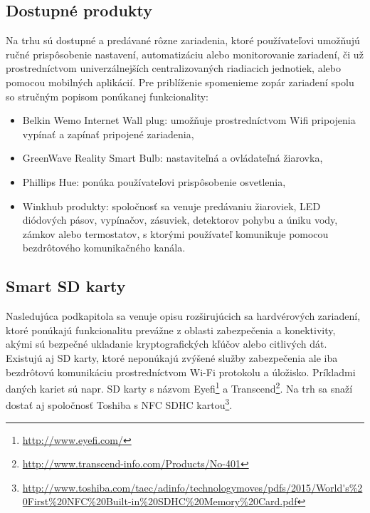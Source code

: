 \documentclass[12pt,a4paper,oneside,openright]{report}
\begin{document}
\subsection{Dostupné produkty} \label{s_devices}
Na trhu sú dostupné a predávané rôzne zariadenia, ktoré používateľovi umožňujú ručné prispôsobenie nastavení, automatizáciu alebo monitorovanie zariadení, či už prostredníctvom univerzálnejších centralizovaných riadiacich jednotiek, alebo pomocou mobilných aplikácií.
Pre priblíženie spomenieme zopár zariadení spolu so stručným popisom ponúkanej funkcionality:
\begin{itemize}
	\item Belkin Wemo Internet Wall plug: umožňuje prostredníctvom Wifi pripojenia vypínať a zapínať pripojené zariadenia,
	\item GreenWave Reality Smart Bulb: nastaviteľná a ovládateľná žiarovka,
	\item Phillips Hue: ponúka používateľovi prispôsobenie osvetlenia,
	\item Winkhub produkty: spoločnosť sa venuje predávaniu žiaroviek, LED diódových pásov, vypínačov, zásuviek, detektorov pohybu a úniku vody, zámkov alebo termostatov, s ktorými používateľ komunikuje pomocou bezdrôtového komunikačného kanála.
\end{itemize}
\onehalfspacing


\subsection{Smart SD karty}
Nasledujúca podkapitola sa venuje opisu rozširujúcich sa hardvérových zariadení, ktoré ponúkajú funkcionalitu prevážne z oblasti zabezpečenia a konektivity, akými sú bezpečné ukladanie kryptografických kľúčov alebo citlivých dát.
Existujú aj SD karty, ktoré neponúkajú zvýšené služby zabezpečenia ale iba bezdrôtovú komunikáciu prostredníctvom Wi-Fi protokolu a úložisko. Príkladmi daných kariet sú napr. SD karty s názvom Eyefi\footnote{\url{http://www.eyefi.com/}} a Transcend\footnote{\url{http://www.transcend-info.com/Products/No-401}}. Na trh sa snaží dostať aj spoločnosť Toshiba s NFC SDHC  kartou\footnote{\url{http://www.toshiba.com/taec/adinfo/technologymoves/pdfs/2015/World's\%20First\%20NFC\%20Built-in\%20SDHC\%20Memory\%20Card.pdf}}.
\end{document}
